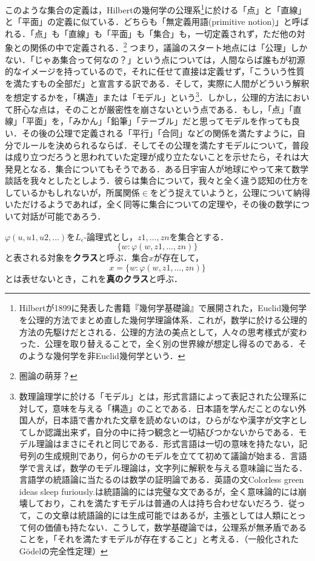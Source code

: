 \documentclass[uplatex, 12pt, a4paper, dvipdfmx]{jsarticle}
\begin{document}
このような集合の定義は，Hilbertの幾何学の公理系\footnote{Hilbertが1899に発表した書籍『幾何学基礎論』で展開された，Euclid幾何学を公理的方法でまとめ直した幾何学理論体系．これが，数学に於ける公理的方法の先駆けだとされる．公理的方法の美点として，人々の思考様式が変わった．公理を取り替えることで，全く別の世界線が想定し得るのである．そのような幾何学を非Euclid幾何学という．}に於ける「点」と「直線」と「平面」の定義に似ている．どちらも「無定義用語(primitive notion)」と呼ばれる．「点」も「直線」も「平面」も「集合」も，一切定義されず，ただ他の対象との関係の中で定義される．\footnote{圏論の萌芽？} つまり，議論のスタート地点には「公理」しかない．「じゃあ集合って何なの？」という点については，人間ならば誰もが初源的なイメージを持っているので，それに任せて直接は定義せず，「こういう性質を満たすもの全部だ」と宣言する訳である．そして，実際に人間がどういう解釈を想定するかを，「構造」または「モデル」という\footnote{数理論理学に於ける「モデル」とは，形式言語によって表記された公理系に対して，意味を与える「構造」のことである．日本語を学んだことのない外国人が，日本語で書かれた文章を読めないのは，ひらがなや漢字が文字としてしか認識出来ず，自分の中に持つ観念と一切結びつかないからである．モデル理論はまさにそれと同じである．形式言語は一切の意味を持たない，記号列の生成規則であり，何らかのモデルを立てて初めて議論が始まる．言語学で言えば，数学のモデル理論は，文字列に解釈を与える意味論に当たる．言語学の統語論に当たるのは数学の証明論である．英語の文Colorless green ideas sleep furiously.は統語論的には完璧な文であるが，全く意味論的には崩壊しており，これを満たすモデルは普通の人は持ち合わせないだろう．従って，この文章は統語論的には生成可能ではあるが，主張としては人類にとって何の価値も持たない．こうして，数学基礎論では，公理系が無矛盾であることを，「それを満たすモデルが存在すること」と考える．（一般化されたGödelの完全性定理）}．しかし，公理的方法において肝心な点は，そのことが厳密性を崩さないという点である．もし，「点」「直線」「平面」を，「みかん」「鉛筆」「テーブル」だと思ってモデルを作っても良い．その後の公理で定義される「平行」「合同」などの関係を満たすように，自分でルールを決められるならば．そしてその公理を満たすモデルについて，普段は成り立つだろうと思われていた定理が成り立たないことを示せたら，それは大発見となる．集合についてもそうである．ある日宇宙人が地球にやって来て数学談話を我々としたとしよう．彼らは集合について，我々と全く違う認知の仕方をしているかもしれないが，所属関係$\in$をどう捉えていようと，公理について納得いただけるようであれば，全く同等に集合についての定理や，その後の数学について対話が可能であろう．

\begin{shadebox}\begin{definition}[クラス(ZF)]
	$\varphi (u,u1,u2,\dots)$を$L_\epsilon$-論理式とし，$z1,\dots,zn$を集合とする．$$\{w:\varphi (w,z1,\dots,zn)\}$$と表される対象を\textbf{クラス}と呼ぶ．集合$x$が存在して，$$x=\{w:\varphi (w,z1,\dots,zn)\}$$とは表せないとき，これを\textbf{真のクラス}と呼ぶ．
\end{definition}\end{shadebox}
\end{document}
